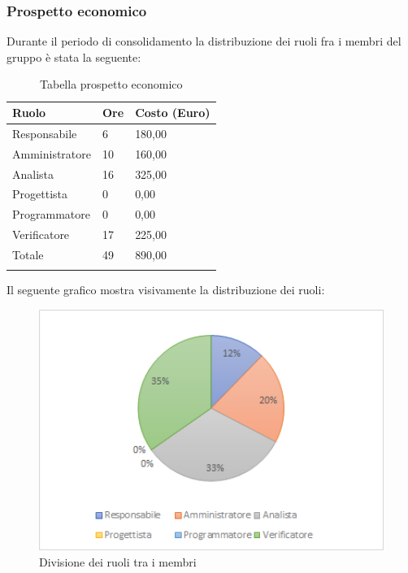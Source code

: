 \subsubsection{Prospetto economico}
Durante il periodo di consolidamento la distribuzione dei ruoli fra i membri del gruppo è stata la seguente:
\begin{center}
	\renewcommand{\arraystretch}{1.5}
	\begin{longtable}[H]{  p{5.6cm}  p{3cm} p{3cm}  }
		\rowcolor{tableHeadYellow}
		\textbf{Ruolo}   & \textbf{Ore} & \textbf{Costo (Euro)} \\ 
		\endhead
		Responsabile   & 6    & 180,00 \\
		Amministratore & 10    & 160,00 \\
		Analista       & 16   & 325,00 \\
		Progettista    & 0    & 0,00 \\
		Programmatore  & 0    & 0,00 \\
		Verificatore   & 17   & 225,00 \\
		Totale         & 49   & 890,00 \\
		\rowcolor{white}
		\caption{Tabella prospetto economico}
	\end{longtable}
\end{center}
Il seguente grafico mostra visivamente la distribuzione dei ruoli:
\begin{figure}[H]
	\centering
	\includegraphics[width=15cm,keepaspectratio]{../includes/pics/grafici/grafico4.png}
	\caption{\label{fig:mission}Divisione dei ruoli tra i membri}
\end{figure}
\clearpage
